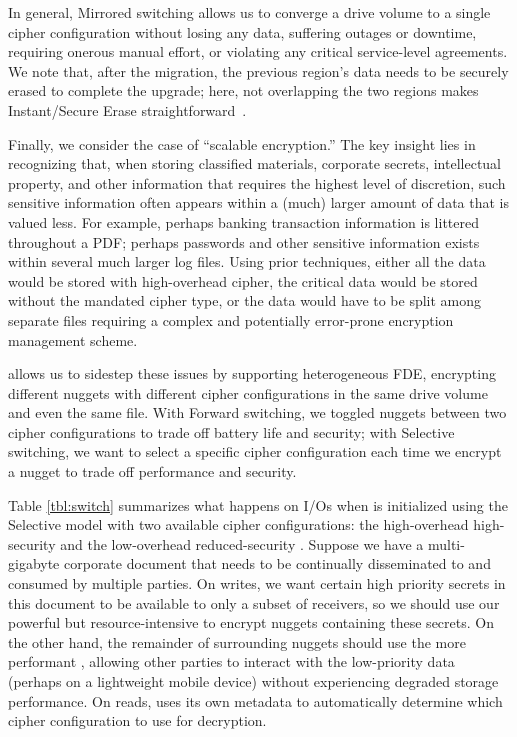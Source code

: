 In general, Mirrored switching allows us to converge a drive volume to a single
cipher configuration without losing any data, suffering outages or downtime,
requiring onerous manual effort, or violating any critical service-level
agreements. We note that, after the migration, the previous region's data needs
to be securely erased to complete the upgrade; here, not overlapping the two
regions makes Instant/Secure Erase straightforward~\cite{ISE1,ISE2}.



 Finally, we consider the case of ``scalable
encryption.'' The key insight lies in recognizing that, when storing classified
materials, corporate secrets, intellectual property, and other information that
requires the highest level of discretion, such sensitive information often
appears within a (much) larger amount of data that is valued less. For example,
perhaps banking transaction information is littered throughout a PDF; perhaps
passwords and other sensitive information exists within several much larger log
files. Using prior techniques, either all the data would be stored with
high-overhead cipher, the critical data would be stored without the mandated
cipher type, or the data would have to be split among separate files requiring a
complex and potentially error-prone encryption management scheme.

\sys allows us to sidestep these issues by supporting heterogeneous FDE, \ie
encrypting different nuggets with different cipher configurations in the same
drive volume and even the same file. With Forward switching, we toggled nuggets
between two cipher configurations to trade off battery life and security; with
Selective switching, we want to select a specific cipher configuration each time
we encrypt a nugget to trade off performance and security.

Table \cref{tbl:switch} summarizes what happens on I/Os when \sys is initialized
using the Selective model with two available cipher configurations: the
high-overhead high-security \cone and the low-overhead reduced-security \ctwo.
Suppose we have a multi-gigabyte corporate document that needs to be continually
disseminated to and consumed by multiple parties. On writes, we want certain
high priority secrets in this document to be available to only a subset of
receivers, so we should use our powerful but resource-intensive \cone to encrypt
nuggets containing these secrets. On the other hand, the remainder of
surrounding nuggets should use the more performant \ctwo, allowing other parties
to interact with the low-priority data (perhaps on a lightweight mobile device)
without experiencing degraded storage performance. On reads, \sys uses its own
metadata to automatically determine which cipher configuration to use for
decryption.
